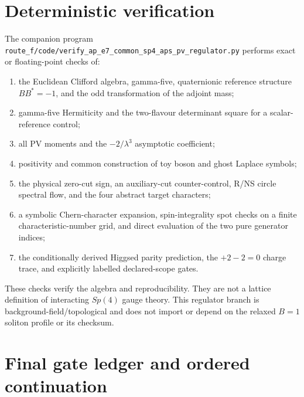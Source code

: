 \documentclass[11pt]{article}
\theoremstyle{definition}
\theoremstyle{remark}
\begin{document}
\section{Deterministic verification}

The companion program
\texttt{route\_f/code/verify\_ap\_e7\_common\_sp4\_aps\_pv\_regulator.py}
performs exact or floating-point checks of:
\begin{enumerate}
\item the Euclidean Clifford algebra, gamma-five, quaternionic reference
  structure \(BB^*=-1\), and the odd transformation of the adjoint mass;
\item gamma-five Hermiticity and the two-flavour determinant square for a
  scalar-reference control;
\item all PV moments and the \(-2/\lambda^3\) asymptotic coefficient;
\item positivity and common construction of toy boson and ghost Laplace
  symbols;
\item the physical zero-cut sign, an auxiliary-cut counter-control, R/NS
  circle spectral flow, and the four abstract target characters;
\item a symbolic Chern-character expansion, spin-integrality spot checks on a
  finite characteristic-number grid, and direct evaluation of the two pure
  generator indices;
\item the conditionally derived Higgsed parity prediction, the
  \(+2-2=0\) charge trace, and explicitly labelled declared-scope gates.
\end{enumerate}
These checks verify the algebra and reproducibility.  They are not a lattice
definition of interacting \(Sp(4)\) gauge theory.
This regulator branch is background-field/topological and does not import or
depend on the relaxed \(B=1\) soliton profile or its checksum.

\section{Final gate ledger and ordered continuation}
\end{document}
